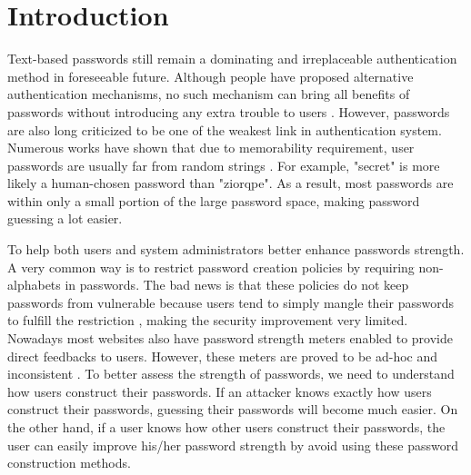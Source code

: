 
\section{Introduction}
Text-based passwords still remain a dominating and irreplaceable authentication method in foreseeable future. Although people have proposed alternative authentication mechanisms, no such mechanism can bring all benefits of passwords without introducing any extra trouble to users \cite{bonneau2012quest}. However, passwords are also long criticized to be one of the weakest link in authentication system. Numerous works have shown that due to memorability requirement, user passwords are usually far from random strings \cite{bonneau2012science}\cite{malone2012investigating}\cite{narayanan2005fast}\cite{veras2012visualizing}\cite{yan2004password}. For example, "secret" is more likely a human-chosen password than "ziorqpe". As a result, most passwords are within only a small portion of the large password space, making password guessing a lot easier. 

To help both users and system administrators better enhance passwords strength. A very common way is to restrict password creation policies by requiring non-alphabets in passwords. The bad news is that these policies do not keep passwords from vulnerable because users tend to simply mangle their passwords to fulfill the restriction \cite{weir2010testing}, making the security improvement very limited. Nowadays most websites also have password strength meters enabled to provide direct feedbacks to users. However, these meters are proved to be ad-hoc and inconsistent \cite{de2014very}. To better assess the strength of passwords, we need to understand how users construct their passwords. If an attacker knows exactly how users construct their passwords, guessing their passwords will become much easier. On the other hand, if a user knows how other users construct their passwords, the user can easily improve his/her password strength by avoid using these password construction methods. 

